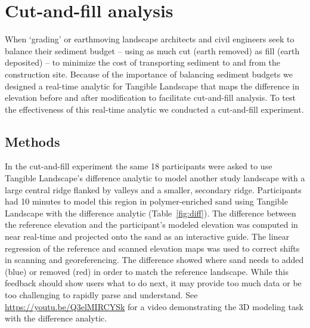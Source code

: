 \documentclass[Afour,sagev,times]{sagej} %
\begin{document}


\section{Cut-and-fill analysis}
When `grading' or earthmoving
landscape architects and civil engineers
seek to balance their sediment budget 
-- using as much cut (earth removed) 
as fill (earth deposited) --
to minimize the cost of transporting sediment to and from
the construction site.
Because of the importance 
of balancing sediment budgets
we designed a real-time analytic 
for Tangible Landscape that 
maps the difference in elevation
before and after modification
to facilitate cut-and-fill analysis. 
To test the effectiveness of this real-time analytic
we conducted a cut-and-fill experiment.

\subsection{Methods}
In the cut-and-fill experiment 
the same 18 participants were asked to use 
Tangible Landscape's difference analytic to model 
another study landscape
with a large central ridge 
flanked by valleys 
and a smaller, secondary ridge.
Participants had 10 minutes to model this region
in polymer-enriched sand using Tangible Landscape 
with the difference analytic (Table~\ref{fig:diff}). 
The difference between the reference elevation 
and the participant's modeled elevation
was computed in near real-time and projected onto the sand 
as an interactive guide.
The linear regression of the reference and scanned elevation maps 
was used to correct shifts in scanning and georeferencing. 
The difference showed where 
sand needs to added (blue) or removed (red) 
in order to match the reference landscape.
While this feedback should show users what to do next, 
it may provide too much data 
or be too challenging to rapidly parse and understand.
See \url{https://youtu.be/Q3elMIRCYSk}
for a video demonstrating the 3D modeling task 
with the difference analytic.
\end{document}
